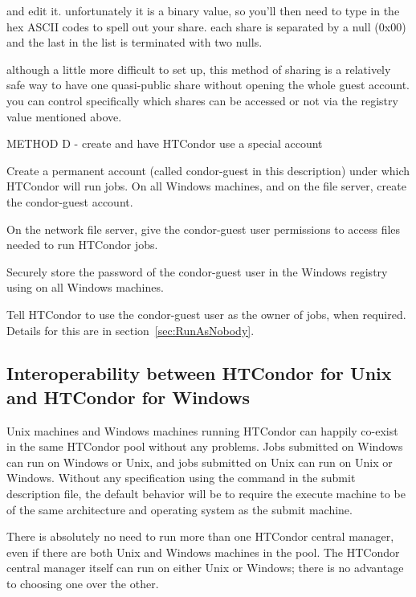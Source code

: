 and edit it.  unfortunately it is a binary value, so you'll then need to
type in the hex ASCII codes to spell out your share.  each share is
separated by a null (0x00) and the last in the list is terminated with
two nulls.

although a little more difficult to set up, this method of sharing is a
relatively safe way to have one quasi-public share without opening the
whole guest account.  you can control specifically which shares can be 
accessed or not via the registry value mentioned above.


METHOD D -  create and have HTCondor use a special account

Create a permanent account (called condor-guest in this description)
under which HTCondor will run jobs.
On all Windows machines, and on the file server, create the
condor-guest account.

On the network file server, give the condor-guest user permissions
to access files needed to run HTCondor jobs.

Securely store the password of the condor-guest user in the
Windows registry using  on all Windows
machines.

Tell HTCondor to use the condor-guest user as the owner of jobs,
when required.
Details for this are in 
section~\ref{sec:RunAsNobody}.

\subsection{Interoperability between HTCondor for Unix and HTCondor for Windows}

Unix machines and Windows machines running HTCondor can happily
co-exist in the same HTCondor pool without any problems.
Jobs submitted on Windows can run on Windows or Unix,
and jobs submitted on Unix can run on Unix or Windows.
Without any specification
using the  command in the submit description file,
the default behavior will be to 
require the execute machine to be of the same architecture and operating
system as the submit machine.

There is absolutely no need to run more than one HTCondor central manager,
even if there are both Unix and Windows machines in the pool.
The HTCondor central manager
itself can run on either Unix or Windows; there is no advantage to choosing
one over the other.

